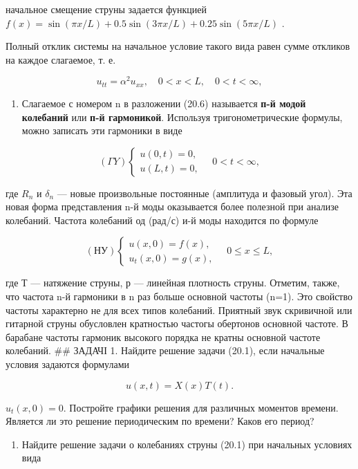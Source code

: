 \documentclass[
  ukrainian,
]{article}
\providecommand{\tightlist}{%
  \setlength{\itemsep}{0pt}\setlength{\parskip}{0pt}}
\begin{document}
начальное смещение струны задается функцией
\(f(x) = \sin(\pi x/L) + 0.5 \sin(3\pi x/L) + 0.25 \sin(5\pi x/L)\) .

Полный отклик системы на начальное условие такого вида равен сумме
откликов на каждое слагаемое, т. е.

\[
u_{tt} = \alpha^2 u_{xx}, \quad 0 < x < L, \quad 0 < t < \infty,
\]

\begin{enumerate}
\def\labelenumi{\arabic{enumi}.}
\setcounter{enumi}{1}
\tightlist
\item
  Слагаемое с номером n в разложении (20.6) называется \textbf{п-й модой
  колебаний} или \textbf{п-й гармоникой}. Используя тригонометрические
  формулы, можно записать эти гармоники в виде
\end{enumerate}

\[
(\Gamma Y) \begin{cases} u(0, t) = 0, \\ u(L, t) = 0, \end{cases} \quad 0 < t < \infty,
\]

где \(R_n\) и \(\delta_n\) --- новые произвольные постоянные (амплитуда
и фазовый угол). Эта новая форма представления n-й моды оказывается
более полезной при анализе колебаний. Частота колебаний од (рад/с) и-й
моды находится по формуле

\[
(\text{НУ}) \begin{cases} u(x, 0) = f(x), \\ u_t(x, 0) = g(x), \end{cases} \quad 0 \le x \le L,
\]

где Т --- натяжение струны, р --- линейная плотность струны. Отметим,
также, что частота n-й гармоники в n раз больше основной частоты (n=1).
Это свойство частоты характерно не для всех типов колебаний. Приятный
звук скривичной или гитарной струны обусловлен кратностью частогы
обертонов основной частоте. В барабане частоты гармоник высокого порядка
не кратны основной частоте колебаний. \#\# ЗАДАЧІ 1. Найдите решение
задачи (20.1), если начальные условия задаются формулами

\[
u(x, t) = X(x) T(t).
\]

\(u_t(x, 0) = 0.\) Постройте графики решения для различных моментов
времени. Является ли это решение периодическим по времени? Каков его
период?

\begin{enumerate}
\def\labelenumi{\arabic{enumi}.}
\setcounter{enumi}{1}
\tightlist
\item
  Найдите решение задачи о колебаниях струны (20.1) при начальных
  условиях вида
\end{enumerate}
\end{document}
